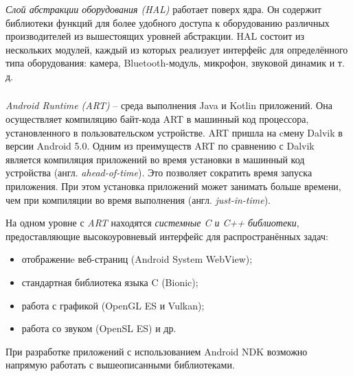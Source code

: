 \subsubsection{}
\label{subsub:android_platform:struct_and_arch:hal}
\textit{Слой абстракции оборудования (HAL)} работает поверх ядра.
Он содержит библиотеки функций для более удобного доступа к оборудованию различных производителей из вышестоящих уровней абстракции.
HAL состоит из нескольких модулей, каждый из которых реализует интерфейс для определённого типа оборудования: камера, Bluetooth-модуль, микрофон, звуковой динамик и т. д. 

\subsubsection{}
\label{subsub:android_platform:struct_and_arch:art}
\textit{Android Runtime (ART)} -- среда выполнения Java и Kotlin приложений.
Она осуществляет компиляцию байт-кода ART в машинный код процессора, установленного в пользовательском устройстве.
ART пришла на cмену Dalvik в версии Android 5.0.
Одним из преимуществ ART по сравнению с Dalvik является компиляция приложений во время установки в машинный код устройства (англ. \textit{ahead-of-time}).
Это позволяет сократить время запуска приложения.
При этом установка приложений может занимать больше времени, чем при компиляции во время выполнения (англ. \textit{just-in-time}).

На одном уровне с \textit{ART} находятся \textit{системные C и C++ библиотеки}, предоставляющие высокоуровневый интерфейс для распространённых задач:
\begin{itemize}
	\item отображениe веб-страниц (Android System WebView);
	\item стандартная библиотека языка C (Bionic);
	\item работа с графикой (OpenGL ES и Vulkan);
	\item работа со звуком (OpenSL ES) и др.
\end{itemize}

При разработке приложений с использованием Android NDK возможно напрямую работать с вышеописанными библиотеками.

